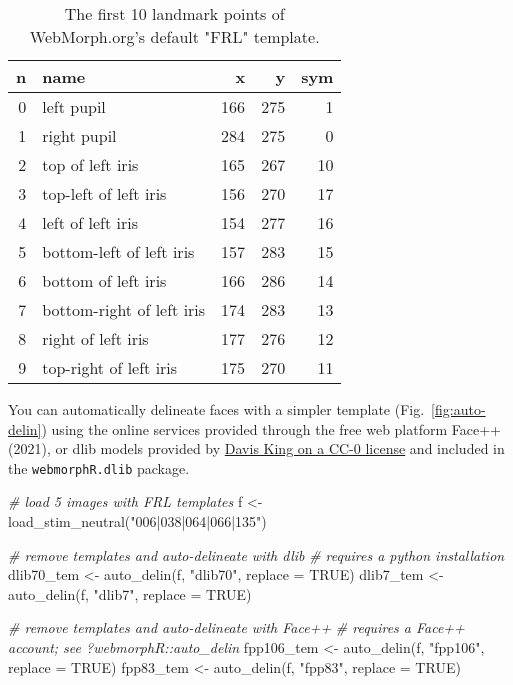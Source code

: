 \documentclass[
  doc,floatsintext]{apa6}
\newenvironment{Shaded}{\begin{snugshade}}{\end{snugshade}}
\newcommand{\AttributeTok}[1]{\textcolor[rgb]{0.77,0.63,0.00}{#1}}
\newcommand{\CommentTok}[1]{\textcolor[rgb]{0.56,0.35,0.01}{\textit{#1}}}
\newcommand{\ConstantTok}[1]{\textcolor[rgb]{0.00,0.00,0.00}{#1}}
\newcommand{\FunctionTok}[1]{\textcolor[rgb]{0.00,0.00,0.00}{#1}}
\newcommand{\NormalTok}[1]{#1}
\newcommand{\OtherTok}[1]{\textcolor[rgb]{0.56,0.35,0.01}{#1}}
\newcommand{\StringTok}[1]{\textcolor[rgb]{0.31,0.60,0.02}{#1}}
\begin{document}
\begin{table}

\caption{\label{tab:tem-def}The first 10 landmark points of WebMorph.org's default "FRL" template.}
\centering
\begin{tabular}[t]{r|l|r|r|r}
\hline
n & name & x & y & sym\\
\hline
0 & left pupil & 166 & 275 & 1\\
\hline
1 & right pupil & 284 & 275 & 0\\
\hline
2 & top of left iris & 165 & 267 & 10\\
\hline
3 & top-left of left iris & 156 & 270 & 17\\
\hline
4 & left of left iris & 154 & 277 & 16\\
\hline
5 & bottom-left of left iris & 157 & 283 & 15\\
\hline
6 & bottom of left iris & 166 & 286 & 14\\
\hline
7 & bottom-right of left iris & 174 & 283 & 13\\
\hline
8 & right of left iris & 177 & 276 & 12\\
\hline
9 & top-right of left iris & 175 & 270 & 11\\
\hline
\end{tabular}
\end{table}

You can automatically delineate faces with a simpler template (Fig.~\ref{fig:auto-delin}) using the online services provided through the free web platform Face++ (2021), or dlib models provided by \href{https://github.com/davisking/dlib-models}{Davis King on a CC-0 license} and included in the \texttt{webmorphR.dlib} package.

\begin{Shaded}
\begin{Highlighting}[]
\CommentTok{\# load 5 images with FRL templates}
\NormalTok{f }\OtherTok{\textless{}{-}} \FunctionTok{load\_stim\_neutral}\NormalTok{(}\StringTok{"006|038|064|066|135"}\NormalTok{)}

\CommentTok{\# remove templates and auto{-}delineate with dlib}
\CommentTok{\# requires a python installation}
\NormalTok{dlib70\_tem }\OtherTok{\textless{}{-}} \FunctionTok{auto\_delin}\NormalTok{(f, }\StringTok{"dlib70"}\NormalTok{, }\AttributeTok{replace =} \ConstantTok{TRUE}\NormalTok{)}
\NormalTok{dlib7\_tem }\OtherTok{\textless{}{-}} \FunctionTok{auto\_delin}\NormalTok{(f, }\StringTok{"dlib7"}\NormalTok{, }\AttributeTok{replace =} \ConstantTok{TRUE}\NormalTok{)}

\CommentTok{\# remove templates and auto{-}delineate with Face++}
\CommentTok{\# requires a Face++ account; see ?webmorphR::auto\_delin}
\NormalTok{fpp106\_tem }\OtherTok{\textless{}{-}} \FunctionTok{auto\_delin}\NormalTok{(f, }\StringTok{"fpp106"}\NormalTok{, }\AttributeTok{replace =} \ConstantTok{TRUE}\NormalTok{)}
\NormalTok{fpp83\_tem }\OtherTok{\textless{}{-}} \FunctionTok{auto\_delin}\NormalTok{(f, }\StringTok{"fpp83"}\NormalTok{, }\AttributeTok{replace =} \ConstantTok{TRUE}\NormalTok{)}
\end{Highlighting}
\end{Shaded}
\end{document}
